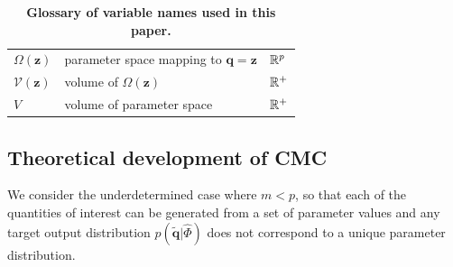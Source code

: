 \begin{table}[htbp]
\begin{adjustwidth}{0in}{0in}
\begin{tabularx}{1.1\textwidth}{lll}
$\Omega(\boldsymbol{z})$              & parameter space mapping to $\boldsymbol{q}=\boldsymbol{z}$         & $\mathbb{R}^p$ \\
$\mathcal{V}(\boldsymbol{z})$         & volume of $\Omega(\boldsymbol{z})$                                 & $\mathbb{R}^+$ \\
$V$                                   & volume of parameter space                                          & $\mathbb{R}^+$ \\
\end{tabularx}
\caption{\textbf{Glossary of variable names used in this paper.}} %
\label{tab:variable_glossary}
\end{adjustwidth}
\end{table}




\subsection{Theoretical development of CMC}

We consider the underdetermined case where $m<p$, so that each of the quantities of interest can be generated from a set of parameter values and any
target output distribution $p(\tilde{\boldsymbol{q}}|\hat{\Phi})$ does not correspond to a unique parameter distribution.


